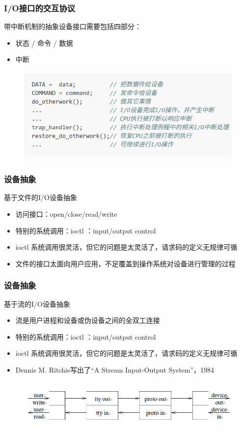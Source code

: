 \begin{frame}[fragile]
    \frametitle{I/O接口的交互协议}
    带中断机制的抽象设备接口需要包括四部分：
    \begin{itemize}
        \item 状态 / 命令 / 数据
        \item 中断
    \end{itemize}
    \begin{figure}
        \includegraphics[width=0.7\linewidth]{figs/intr-io-interface.png}
    \end{figure}
\end{frame}

\begin{frame}[fragile]
    \frametitle{设备抽象}
    基于文件的I/O设备抽象
    \begin{itemize}
        \item 访问接口：open/close/read/write
        \item 特别的系统调用：ioctl ：input/output control
        \item ioctl 系统调用很灵活，但它的问题是太灵活了，请求码的定义无规律可循
        \item 文件的接口太面向用户应用，不足覆盖到操作系统对设备进行管理的过程
    \end{itemize}

\end{frame}

\begin{frame}[fragile]
    \frametitle{设备抽象}
    基于流的I/O设备抽象
    \begin{itemize}
        \item 流是用户进程和设备或伪设备之间的全双工连接
        \item 特别的系统调用：ioctl ：input/output control
        \item ioctl 系统调用很灵活，但它的问题是太灵活了，请求码的定义无规律可循
        \item Dennis M. Ritchie写出了“A Stream Input-Output System”，1984
    \end{itemize}
        \begin{figure}
        \includegraphics[width=0.7\linewidth]{figs/stream.png}
    \end{figure}
\end{frame}

